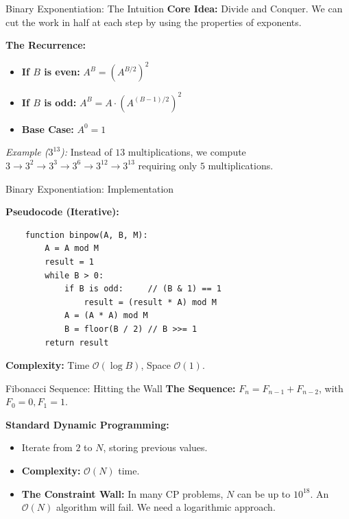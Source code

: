 \documentclass[aspectratio=169]{beamer}
\begin{document}
\begin{frame}{Binary Exponentiation: The Intuition}
    \textbf{Core Idea:} Divide and Conquer. We can cut the work in half at each step by using the properties of exponents.
    
    \vspace{0.3cm}
    \textbf{The Recurrence:}
    \begin{itemize}
        \item \textbf{If $B$ is even:} $A^B = \left(A^{B/2}\right)^2$
        \item \textbf{If $B$ is odd:} $A^B = A \cdot \left(A^{(B-1)/2}\right)^2$
        \item \textbf{Base Case:} $A^0 = 1$
    \end{itemize}
    
    \vspace{0.3cm}
    \textit{Example ($3^{13}$):} 
    Instead of $13$ multiplications, we compute $3 \to 3^2 \to 3^3 \to 3^6 \to 3^{12} \to 3^{13}$ requiring only $5$ multiplications.
\end{frame}

\begin{frame}[fragile]{Binary Exponentiation: Implementation}

    \vspace{0.2cm}
    \textbf{Pseudocode (Iterative):}
    \begin{verbatim}
    function binpow(A, B, M):
        A = A mod M
        result = 1
        while B > 0:
            if B is odd:     // (B & 1) == 1
                result = (result * A) mod M
            A = (A * A) mod M
            B = floor(B / 2) // B >>= 1
        return result
    \end{verbatim}
    
    \textbf{Complexity:} Time $\mathcal{O}(\log B)$, Space $\mathcal{O}(1)$.
\end{frame}

\begin{frame}{Fibonacci Sequence: Hitting the Wall}
    \textbf{The Sequence:} $F_n = F_{n-1} + F_{n-2}$, with $F_0 = 0, F_1 = 1$.
    
    \vspace{0.5cm}
    \textbf{Standard Dynamic Programming:}
    \begin{itemize}
        \item Iterate from $2$ to $N$, storing previous values.
        \item \textbf{Complexity:} $\mathcal{O}(N)$ time.
        \item \textbf{The Constraint Wall:} In many CP problems, $N$ can be up to $10^{18}$. An $\mathcal{O}(N)$ algorithm will fail. We need a logarithmic approach.
    \end{itemize}
\end{frame}
\end{document}
